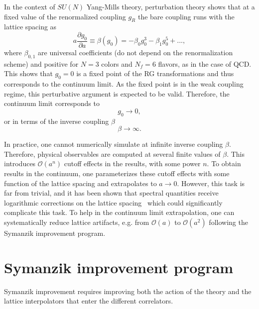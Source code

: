 In the context of $SU(N)$ Yang-Mills theory, perturbation theory shows that at a fixed value of the renormalized coupling $g_R$ the bare coupling runs with the lattice spacing as
\begin{equation}
\label{ch_foundation:eq:beta-func}
a\frac{\partial g_0}{\partial a}\equiv\beta(g_0)=-\beta_0g_0^3-\beta_1g_0^5+...,
\end{equation}
where $\beta_{0,1}$ are universal coefficients (do not depend on the renormalization scheme) and positive for $N=3$ colors and $N_f=6$ flavors, as in the case of QCD. This shows that $g_0=0$ is a fixed point of the RG transformations and thus corresponds to the continuum limit. As the fixed point is in the weak coupling regime, this perturbative argument is expected to be valid. Therefore, the continuum limit corresponds to
\begin{equation}
g_0\rightarrow0,
\end{equation}
or in terms of the inverse coupling $\beta$
\begin{equation}
\beta\rightarrow\infty.
\end{equation}

In practice, one cannot numerically simulate at infinite inverse coupling $\beta$. Therefore, physical observables are computed at several finite values of $\beta$. This introduces $\mathcal{O}(a^n)$ cutoff effects in the results, with some power $n$. To obtain results in the continuum, one parameterizes these cutoff effects with some function of the lattice spacing and extrapolates to $a\rightarrow 0$. However, this task is far from trivial, and it has been shown that spectral quantities receive logarithmic corrections on the lattice spacing~\citep{Husung:2022kvi} which could significantly complicate this task. To help in the continuum limit extrapolation, one can systematically reduce lattice artifacts, e.g. from $\mathcal{O}(a)$ to $\mathcal{O}(a^2)$ following the Symanzik improvement program. 


\section{Symanzik improvement program}
\label{ch_foundation:sec:impr}

Symanzik improvement requires improving both the action of the theory and the lattice interpolators that enter the different correlators. 

